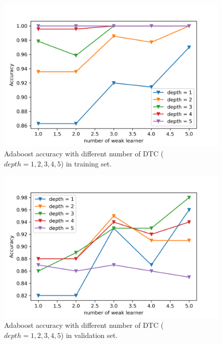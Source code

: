 \documentclass[journal, a4paper]{IEEEtran}
\begin{document}
\begin{figure}[!hbt]
	\begin{center}
		\includegraphics[width=\columnwidth]{dn_ad_tr_acc}
		\caption{Adaboost accuracy with different number of DTC ($depth = 1, 2, 3, 4, 5$) in training set.}
		\label{fig:dn_ad_tr_acc}
	\end{center}
\end{figure} \par

\begin{figure}[!hbt]
	\begin{center}
		\includegraphics[width=\columnwidth]{dn_ad_val_acc}
		\caption{Adaboost accuracy with different number of DTC ($depth = 1, 2, 3, 4, 5$) in validation set.}
		\label{fig:dn_ad_val_acc}
	\end{center}
\end{figure} \par
\end{document}
